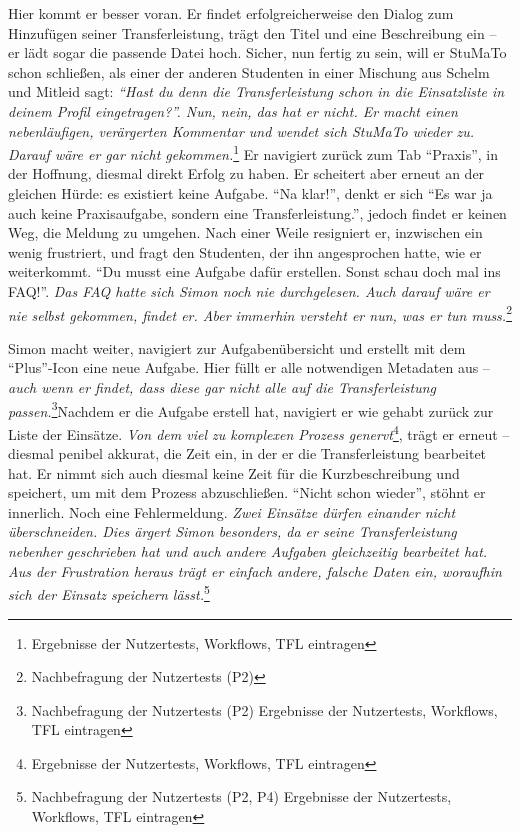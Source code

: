 \documentclass[
  12pt,
  ngerman,
  a4paper,
]{article}
\begin{document}
Hier kommt er besser voran. Er findet erfolgreicherweise den Dialog zum
Hinzufügen seiner Transferleistung, trägt den Titel und eine
Beschreibung ein -- er lädt sogar die passende Datei hoch. Sicher, nun
fertig zu sein, will er StuMaTo schon schließen, als einer der anderen
Studenten in einer Mischung aus Schelm und Mitleid sagt: \emph{``Hast du
denn die Transferleistung schon in die Einsatzliste in deinem Profil
eingetragen?''. Nun, nein, das hat er nicht. Er macht einen
nebenläufigen, verärgerten Kommentar und wendet sich StuMaTo wieder zu.
Darauf wäre er gar nicht gekommen.}\footnote{Ergebnisse der Nutzertests,
  Workflows, TFL eintragen} Er navigiert zurück zum Tab ``Praxis'', in
der Hoffnung, diesmal direkt Erfolg zu haben. Er scheitert aber erneut
an der gleichen Hürde: es existiert keine Aufgabe. ``Na klar!'', denkt
er sich ``Es war ja auch keine Praxisaufgabe, sondern eine
Transferleistung.'', jedoch findet er keinen Weg, die Meldung zu
umgehen. Nach einer Weile resigniert er, inzwischen ein wenig
frustriert, und fragt den Studenten, der ihn angesprochen hatte, wie er
weiterkommt. ``Du musst eine Aufgabe dafür erstellen. Sonst schau doch
mal ins FAQ!''. \emph{Das FAQ hatte sich Simon noch nie durchgelesen.
Auch darauf wäre er nie selbst gekommen, findet er. Aber immerhin
versteht er nun, was er tun muss.}\footnote{Nachbefragung der
  Nutzertests (P2)}

Simon macht weiter, navigiert zur Aufgabenübersicht und erstellt mit dem
``Plus''-Icon eine neue Aufgabe. Hier füllt er alle notwendigen
Metadaten aus -- \emph{auch wenn er findet, dass diese gar nicht alle
auf die Transferleistung passen.}\footnote{Nachbefragung der Nutzertests
  (P2) \textbar{} Ergebnisse der Nutzertests, Workflows, TFL eintragen}Nachdem
er die Aufgabe erstell hat, navigiert er wie gehabt zurück zur Liste der
Einsätze. \emph{Von dem viel zu komplexen Prozess genervt}\footnote{Ergebnisse
  der Nutzertests, Workflows, TFL eintragen}, trägt er erneut -- diesmal
penibel akkurat, die Zeit ein, in der er die Transferleistung bearbeitet
hat. Er nimmt sich auch diesmal keine Zeit für die Kurzbeschreibung und
speichert, um mit dem Prozess abzuschließen. ``Nicht schon wieder'',
stöhnt er innerlich. Noch eine Fehlermeldung. \emph{Zwei Einsätze dürfen
einander nicht überschneiden. Dies ärgert Simon besonders, da er seine
Transferleistung nebenher geschrieben hat und auch andere Aufgaben
gleichzeitig bearbeitet hat. Aus der Frustration heraus trägt er einfach
andere, falsche Daten ein, woraufhin sich der Einsatz speichern
lässt.}\footnote{Nachbefragung der Nutzertests (P2, P4) \textbar{}
  Ergebnisse der Nutzertests, Workflows, TFL eintragen}
\end{document}
